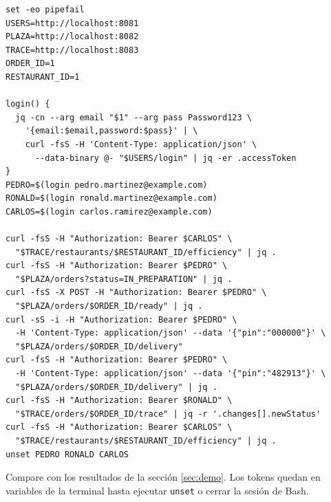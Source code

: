 \documentclass[11pt,a4paper]{article}
\newcommand{\code}[1]{\nolinkurl{#1}}
\begin{document}
\begin{lstlisting}
set -eo pipefail
USERS=http://localhost:8081
PLAZA=http://localhost:8082
TRACE=http://localhost:8083
ORDER_ID=1
RESTAURANT_ID=1

login() {
  jq -cn --arg email "$1" --arg pass Password123 \
    '{email:$email,password:$pass}' | \
    curl -fsS -H 'Content-Type: application/json' \
      --data-binary @- "$USERS/login" | jq -er .accessToken
}
PEDRO=$(login pedro.martinez@example.com)
RONALD=$(login ronald.martinez@example.com)
CARLOS=$(login carlos.ramirez@example.com)

curl -fsS -H "Authorization: Bearer $CARLOS" \
  "$TRACE/restaurants/$RESTAURANT_ID/efficiency" | jq .
curl -fsS -H "Authorization: Bearer $PEDRO" \
  "$PLAZA/orders?status=IN_PREPARATION" | jq .
curl -fsS -X POST -H "Authorization: Bearer $PEDRO" \
  "$PLAZA/orders/$ORDER_ID/ready" | jq .
curl -sS -i -H "Authorization: Bearer $PEDRO" \
  -H 'Content-Type: application/json' --data '{"pin":"000000"}' \
  "$PLAZA/orders/$ORDER_ID/delivery"
curl -fsS -H "Authorization: Bearer $PEDRO" \
  -H 'Content-Type: application/json' --data '{"pin":"482913"}' \
  "$PLAZA/orders/$ORDER_ID/delivery" | jq .
curl -fsS -H "Authorization: Bearer $RONALD" \
  "$TRACE/orders/$ORDER_ID/trace" | jq -r '.changes[].newStatus'
curl -fsS -H "Authorization: Bearer $CARLOS" \
  "$TRACE/restaurants/$RESTAURANT_ID/efficiency" | jq .
unset PEDRO RONALD CARLOS
\end{lstlisting}

Compare con los resultados de la sección \ref{sec:demo}. Los tokens quedan en variables de la terminal hasta ejecutar \code{unset} o cerrar la sesión de Bash.
\end{document}
